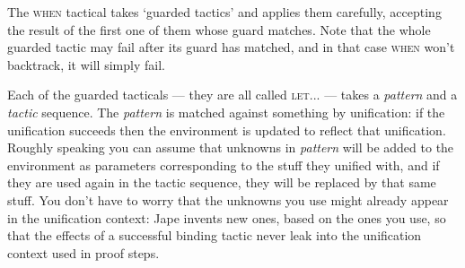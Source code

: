 The \textsc{when} tactical takes `guarded tactics' and applies them carefully, accepting the result of the first one of them whose guard matches. Note that the whole guarded tactic may fail after its guard has matched, and in that case \textsc{when} won't backtrack, it will simply fail.


Each of the guarded tacticals --- they are all called \textsc{let...} --- takes a \textit{pattern} and a \textit{tactic} sequence. The \textit{pattern} is matched against something by unification: if the unification succeeds then the environment is updated to reflect that unification. Roughly speaking you can assume that unknowns in \textit{pattern} will be added to the environment as parameters corresponding to the stuff they unified with, and if they are used again in the tactic sequence, they will be replaced by that same stuff. You don't have to worry that the unknowns you use might already appear in the unification context: Jape invents new ones, based on the ones you use, so that the effects of a successful binding tactic never leak into the unification context used in proof steps.

 